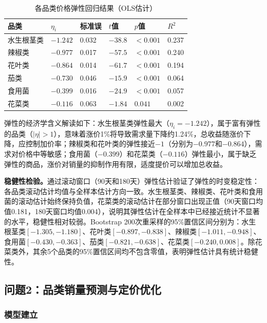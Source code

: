 \documentclass[12pt,a4paper]{ctexart}
\begin{document}
\begin{table}[H]
\centering
\caption{各品类价格弹性回归结果（OLS估计）}
\label{tab:elasticity}
\begin{tabularx}{\textwidth}{lYYYYY}
\toprule
品类 & $\eta_i$ & 标准误 & $t$值 & $p$值 & $R^2$ \\
\midrule
水生根茎类 & $-1.242$ & 0.032 & $-38.8$ & $<0.001$ & 0.237 \\
辣椒类 & $-0.977$ & 0.017 & $-57.5$ & $<0.001$ & 0.240 \\
花叶类 & $-0.864$ & 0.014 & $-61.7$ & $<0.001$ & 0.194 \\
茄类 & $-0.730$ & 0.046 & $-15.9$ & $<0.001$ & 0.064 \\
食用菌 & $-0.399$ & 0.016 & $-24.9$ & $<0.001$ & 0.057 \\
花菜类 & $-0.116$ & 0.063 & $-1.84$ & $0.041$ & 0.002 \\
\bottomrule
\end{tabularx}
\end{table}

弹性的经济学含义解读如下：水生根茎类弹性最大（$\eta_i=-1.242$），属于富有弹性的品类（$|\eta|>1$），意味着涨价1\%将导致需求量下降约1.24\%，总收益随涨价下降，应控制加价率；辣椒类和花叶类的弹性接近$-1$（分别为$-0.977$和$-0.864$），需求对价格中等敏感；食用菌（$-0.399$）和花菜类（$-0.116$）弹性最小，属于缺乏弹性的商品，涨价对销量的抑制作用有限，适度提价可以增加总收益。

\textbf{稳健性检验。}通过滚动窗口（90天和180天）弹性估计验证了弹性的时变稳定性：各品类滚动估计均值与全样本估计方向一致。水生根茎类、辣椒类、花叶类和食用菌的滚动估计始终保持负值，花菜类的滚动估计在部分窗口出现正值（90天窗口均值0.181，180天窗口均值0.004），说明其弹性估计在全样本中已经接近统计不显著的水平，稳健性相对较弱。Bootstrap 200次重采样的95\%置信区间分别为：水生根茎类$[-1.305,-1.180]$、花叶类$[-0.897,-0.838]$、辣椒类$[-1.011,-0.948]$、食用菌$[-0.430,-0.363]$、茄类$[-0.821,-0.638]$、花菜类$[-0.240,0.008]$。除花菜类外，其余5个品类的95\%置信区间均不包含零值，表明弹性估计具有统计稳健性。

\subsection{问题2：品类销量预测与定价优化}

\subsubsection{模型建立}
\end{document}
